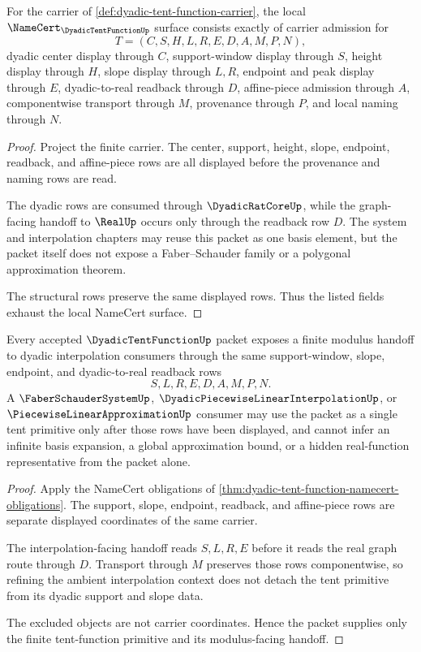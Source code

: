 \begin{theorem}
\label{thm:dyadic-tent-function-namecert-obligations}
For the carrier of \autoref{def:dyadic-tent-function-carrier}, the local $\NameCert_{\DyadicTentFunctionUp}$ surface consists exactly of carrier admission for
$$
T=(C,S,H,L,R,E,D,A,M,P,N),
$$
dyadic center display through $C$, support-window display through $S$, height display through $H$, slope display through $L,R$, endpoint and peak display through $E$, dyadic-to-real readback through $D$, affine-piece admission through $A$, componentwise transport through $M$, provenance through $P$, and local naming through $N$.
\end{theorem}
\begin{proof}
Project the finite carrier. The center, support, height, slope, endpoint, readback, and affine-piece rows are all displayed before the provenance and naming rows are read.

The dyadic rows are consumed through $\DyadicRatCoreUp$, while the graph-facing handoff to $\RealUp$ occurs only through the readback row $D$. The system and interpolation chapters may reuse this packet as one basis element, but the packet itself does not expose a Faber--Schauder family or a polygonal approximation theorem.

The structural rows preserve the same displayed rows. Thus the listed fields exhaust the local NameCert surface.
\end{proof}

\begin{theorem}
\label{thm:dyadic-tent-function-modulus-handoff}
Every accepted $\DyadicTentFunctionUp$ packet exposes a finite modulus handoff to dyadic interpolation consumers through the same support-window, slope, endpoint, and dyadic-to-real readback rows
$$
S,L,R,E,D,A,M,P,N.
$$
A $\FaberSchauderSystemUp$, $\DyadicPiecewiseLinearInterpolationUp$, or $\PiecewiseLinearApproximationUp$ consumer may use the packet as a single tent primitive only after those rows have been displayed, and cannot infer an infinite basis expansion, a global approximation bound, or a hidden real-function representative from the packet alone.
\end{theorem}
\begin{proof}
Apply the NameCert obligations of \autoref{thm:dyadic-tent-function-namecert-obligations}. The support, slope, endpoint, readback, and affine-piece rows are separate displayed coordinates of the same carrier.

The interpolation-facing handoff reads $S,L,R,E$ before it reads the real graph route through $D$. Transport through $M$ preserves those rows componentwise, so refining the ambient interpolation context does not detach the tent primitive from its dyadic support and slope data.

The excluded objects are not carrier coordinates. Hence the packet supplies only the finite tent-function primitive and its modulus-facing handoff.
\end{proof}

